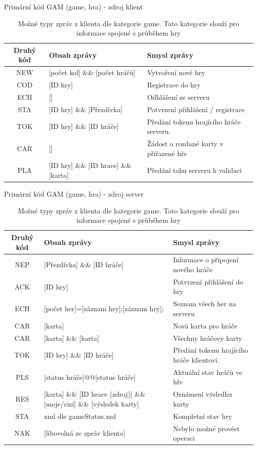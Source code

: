 \documentclass[12pt, a4paper]{article}
\begin{document}
\begin{table}[H]%
\centering
Primární kód GAM (game, hra) - zdroj klient
\begin{tabular}{|c | p{4cm} | p{5cm} |}
\hline
Druhý kód & Obsah zprávy & Smysl zprávy\\
\hline
NEW  & [počet kol]    \&\&    [počet hráčů] & Vytvoření nové hry \\
\hline
COD  &[ID hry] & Registrace do hry\\
\hline
ECH &[] & Odhlášení ze serveru \\
\hline
STA &[ID hry]    \&\&    [Přezdívka] & Potvrzení přihlášení / registrace \\
\hline
TOK &[ID hry]    \&\&    [ID hráče] & Předání tokenu hrajícího hráče serveru. \\
\hline
CAR & [] & Žádost o rozdané karty v přiřazené hře \\
\hline
PLA &[ID hry]    \&\&    [ID hrace]    \&\&    [karta] & Předání tahu serveru k validaci \\

\hline
\end{tabular}
\label{tab:zpravyGAMSKlient}
\caption{Možné typy zpráv z klienta dle kategorie game. Tato kategorie slouží pro informace spojené s průběhem hry}
\end{table}

\begin{table}[H]%
\centering
Primární kód GAM (game, hra) - zdroj server
\begin{tabular}{|c | p{4cm} | p{5cm} |}
\hline
Druhý kód & Obsah zprávy & Smysl zprávy\\
\hline
NEP  & [Přezdívka]    \&\&    [ID hráče] & Informace o připojení nového hráče \\
\hline
ACK  &[ID hry] & Potvrzení přihlášení do hry\\
\hline
ECH &[počet her]=[záznam hry];[záznam hry]; & Seznam všech her na serveru \\
\hline
CAR &[karta] & Nová karta pro hráče \\
\hline
CAR &[karta]    \&\&    [karta] & Všechny hráčovy karty \\
\hline
TOK &[ID hry]    \&\&    [ID hráče] & Předání tokenu hrajícího hráče klientovi. \\
\hline
PLS & [status hráče]@@[status hráče] & Aktuální stav hráčů ve hře \\
\hline
RES &[karta]   \&\&   [ID hrace (zdroj)]   \&\&   [moje/cizí]   \&\&   [výsledek karty] & Oznámení výsledku karty \\
\hline
STA & xml dle gameStatus.xsd & Kompletní stav hry \\
\hline
NAK & [libovolná ze zpráv klienta] & Nebylo možné provést operaci \\
\hline

\end{tabular}
\label{tab:zpravyGamServer}
\caption{Možné typy zpráv z klienta dle kategorie game. Tato kategorie slouží pro informace spojené s průběhem hry}
\end{table}
\end{document}

